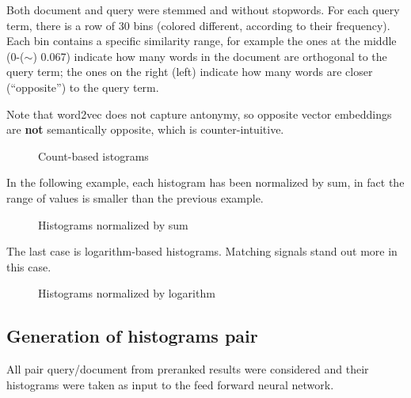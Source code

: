 Both document and query were stemmed and without stopwords. For each query term, there is a row of 30 bins (colored different, according to their frequency). Each bin contains a specific similarity range, for
example the ones at the middle (0-($\sim$) 0.067) indicate how many words in the document are orthogonal to the query term; the ones on the right (left) indicate how many words are closer (``opposite'') to the query term.

Note that word2vec does not capture antonymy, so opposite vector embeddings are \textbf{not} semantically opposite, which is counter-intuitive.

\begin{figure}[H]
  \centering
  \hfill
  \caption{Count-based istograms}
  \label{fig:hist_ex}
\end{figure}

In the following example, each histogram has been normalized by sum, in fact
the range of values is smaller than the previous example.

\begin{figure}[H]
  \centering
  \hfill
  \caption{Histograms normalized by sum}
  \label{fig:hist_nh_ex}
\end{figure}

The last case is logarithm-based histograms. Matching signals stand out more in this case.

\begin{figure}[H]
  \centering
  \hfill
  \caption{Histograms normalized by logarithm}
  \label{fig:hist_lch_sample}
\end{figure}

\subsection{Generation of histograms pair}

All pair query/document from preranked results were considered and their histograms were taken as input to the feed forward neural network.

